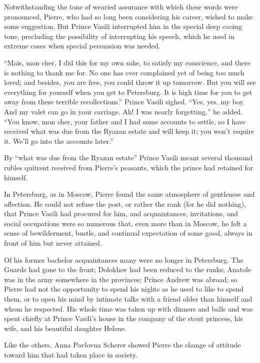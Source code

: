 Notwithstanding the tone of wearied assurance with which these
words were pronounced, Pierre, who had so long been considering
his career, wished to make some suggestion. But Prince Vasili
interrupted him in the special deep cooing tone, precluding the
possibility of interrupting his speech, which he used in extreme
cases when special persuasion was needed.

``Mais, mon cher, I did this for my own sake, to satisfy my
conscience, and there is nothing to thank me for. No one has ever
complained yet of being too much loved; and besides, you are
free, you could throw it up tomorrow. But you will see everything
for yourself when you get to Petersburg. It is high time for you
to get away from these terrible recollections.'' Prince Vasili
sighed. ``Yes, yes, my boy. And my valet can go in your
carriage. Ah! I was nearly forgetting,'' he added. ``You know,
mon cher, your father and I had some accounts to settle, so I
have received what was due from the Ryazan estate and will keep
it; you won't require it. We'll go into the accounts later.''

By ``what was due from the Ryazan estate'' Prince Vasili meant
several thousand rubles quitrent received from Pierre's peasants,
which the prince had retained for himself.

In Petersburg, as in Moscow, Pierre found the same atmosphere of
gentleness and affection. He could not refuse the post, or rather
the rank (for he did nothing), that Prince Vasili had procured
for him, and acquaintances, invitations, and social occupations
were so numerous that, even more than in Moscow, he felt a sense
of bewilderment, bustle, and continual expectation of some good,
always in front of him but never attained.

Of his former bachelor acquaintances many were no longer in
Petersburg.  The Guards had gone to the front; Dolokhov had been
reduced to the ranks; Anatole was in the army somewhere in the
provinces; Prince Andrew was abroad; so Pierre had not the
opportunity to spend his nights as he used to like to spend them,
or to open his mind by intimate talks with a friend older than
himself and whom he respected. His whole time was taken up with
dinners and balls and was spent chiefly at Prince Vasili's house
in the company of the stout princess, his wife, and his beautiful
daughter Helene.

Like the others, Anna Pavlovna Scherer showed Pierre the change
of attitude toward him that had taken place in society.


